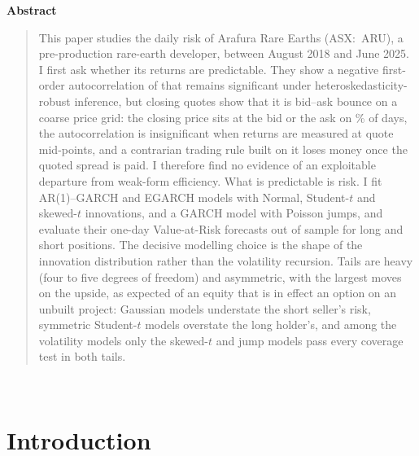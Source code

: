 \documentclass[11pt,a4paper]{article}
\begin{document}
\begin{titlepage}
\begin{center}\textbf{Abstract}\end{center}
\vspace{-2pt}
\begin{quote}
\small
This paper studies the daily risk of Arafura Rare Earths (ASX:\ ARU), a pre-production rare-earth developer, between August 2018 and June 2025. I first ask whether its returns are predictable. They show a negative first-order autocorrelation of \rhoOne{} that remains significant under heteroskedasticity-robust inference, but closing quotes show that it is bid--ask bounce on a coarse price grid: the closing price sits at the bid or the ask on \qAtQuote\% of days, the autocorrelation is insignificant when returns are measured at quote mid-points, and a contrarian trading rule built on it loses money once the quoted spread is paid. I therefore find no evidence of an exploitable departure from weak-form efficiency. What is predictable is risk. I fit AR(1)--GARCH and EGARCH models with Normal, Student-$t$ and skewed-$t$ innovations, and a GARCH model with Poisson jumps, and evaluate their one-day Value-at-Risk forecasts out of sample for long and short positions. The decisive modelling choice is the shape of the innovation distribution rather than the volatility recursion. Tails are heavy (four to five degrees of freedom) and asymmetric, with the largest moves on the upside, as expected of an equity that is in effect an option on an unbuilt project: Gaussian models understate the short seller's risk, symmetric Student-$t$ models overstate the long holder's, and among the volatility models only the skewed-$t$ and jump models pass every coverage test in both tails.
\end{quote}
\vspace{0.5cm}
\\[3pt]
\end{titlepage}
\hypersetup{pageanchor=true}
\setcounter{footnote}{0}
{\hypersetup{linkcolor=black}\tableofcontents}
\clearpage
{}

\section{Introduction}
\end{document}
